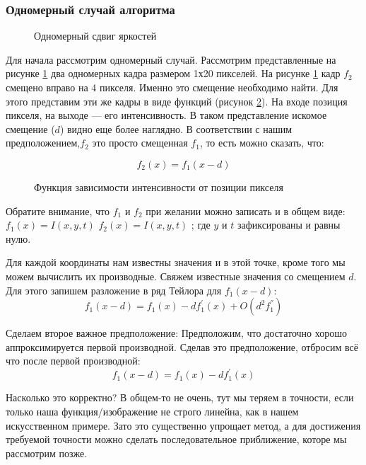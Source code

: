 \subsubsection{Одномерный случай алгоритма}

\begin{figure}[ht]
\caption{Одномерный сдвиг яркостей}
\label{pic:math_1}
\end{figure}

Для начала рассмотрим одномерный случай. Рассмотрим представленные на рисунке \ref{pic:math_1} два одномерных кадра размером 1х20 пикселей. На  рисунке \ref{pic:math_1} кадр $f_2$ смещено вправо на 4 пикселя. Именно это смещение необходимо найти. Для этого представим эти же кадры в виде функций (рисунок \ref{pic:math_2}). На входе позиция пикселя, на выходе — его интенсивность. В таком представление искомое смещение ($d$) видно еще более наглядно. В соответствии с нашим предположением,$f_2$ это просто смещенная $f_1$, то есть можно сказать, что:

\label{eq:f_2}
\begin{equation}
f_2(x)=f_1(x-d)
\end{equation}

\begin{figure}[ht]
\caption{Функция зависимости интенсивности от позиции пикселя}
\label{pic:math_2}
\end{figure}

Обратите внимание, что $f_1$ и $f_2$ при желании можно записать и в общем виде: $f_1(x)=I(x,y,t)$ $f_2(x)=I(x,y,t)$ ; где $y$ и $t$ зафиксированы и равны нулю.

Для каждой координаты нам известны значения и в этой точке, кроме того мы можем вычислить их производные. Свяжем известные значения со смещением $d$. Для этого запишем разложение в ряд Тейлора для $f_1(x-d)$:
$$f_1(x-d)=f_1(x)-df^{'}_1(x)+O(d^2f^{''}_1)$$

Сделаем второе важное предположение: Предположим, что достаточно хорошо аппроксимируется первой производной. Сделав это предположение, отбросим всё что после первой производной:
$$f_1(x-d)=f_1(x)-df_1^{'}(x)$$

Насколько это корректно? В общем-то не очень, тут мы теряем в точности, если только наша функция/изображение не строго линейна, как в нашем искусственном примере. Зато это существенно упрощает метод, а для достижения требуемой точности можно сделать последовательное приближение, которе мы рассмотрим позже.

